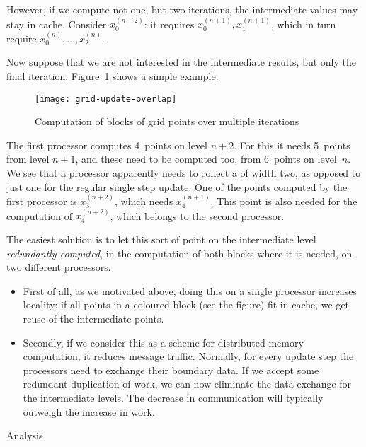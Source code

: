 However,
if we compute not one, but two iterations, the intermediate values
may stay in cache.
Consider $x^{(n+2)}_0$: it requires $x^{(n+1)}_0,x^{(n+1)}_1$,
which in turn require $x^{(n)}_0,\ldots,x^{(n)}_2$.

Now suppose that we are not interested in the intermediate results, but
only the final iteration. Figure~\ref{fig:grid-update-overlap} shows
a simple example.
\begin{figure}[ht]
\texttt{[image: grid-update-overlap]}
\caption{Computation of blocks of grid points over multiple iterations}
\label{fig:grid-update-overlap}
\end{figure}
The first processor computes 4~points on level $n+2$. For this it needs 5~points
from level $n+1$, and these need to be computed too, from 6~points on level~$n$.
We see that a processor apparently needs to collect a 
of width two, as opposed to just one for the regular single step update.
One of the points computed by the first processor is $x^{(n+2)}_3$,
which needs $x^{(n+1)}_4$. This point is also needed for the computation
of $x^{(n+2)}_4$, which belongs to the second processor.

The easiest solution is to let this sort of point on the intermediate
level \emph{redundantly computed}, in 
the computation of both blocks where it is needed, on two different processors.

\begin{itemize}
\item First of all, as we motivated above, doing this 
on a single processor increases locality: if all points in a coloured block
(see the figure) fit in cache, we get reuse of the intermediate points.
\item Secondly, if we consider this as a scheme for distributed memory computation,
it reduces message traffic. Normally, for every update step the processors
need to exchange their boundary data. If we accept some redundant duplication
of work, we can now eliminate the data exchange for the intermediate levels.
The decrease in communication will typically outweigh the increase in work.
\end{itemize}

 {Analysis}

